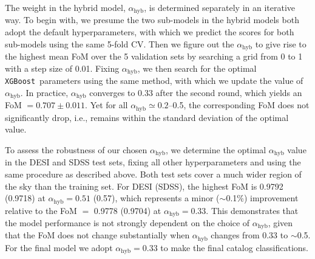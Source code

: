 \documentclass[twocolumn,tighten]{aastex631}
\newcommand{\xgboost}{\texttt{XGBoost}}
\begin{document}
\begin{CJK*}{UTF8}{gbsn}
The weight in the hybrid model, $\alpha_\mathrm{hyb}$, is determined separately in an iterative way. To begin with, we presume the two sub-models in the hybrid models both adopt the default hyperparameters, with which we predict the scores for both sub-models using the same 5-fold CV. Then we figure out the $\alpha_\mathrm{hyb}$ to give rise to the highest mean FoM over the 5 validation sets by searching a grid from 0 to 1 with a step size of 0.01. Fixing $\alpha_\mathrm{hyb}$, we then search for the optimal \xgboost\ parameters using the same method, with which we update the value of $\alpha_\mathrm{hyb}$. In practice, $\alpha_\mathrm{hyb}$ converges to 0.33 after the second round, which yields an FoM $= 0.707\pm0.011$. Yet for all $\alpha_\mathrm{hyb}\simeq0.2$--0.5, the corresponding FoM does not significantly drop, i.e., remains within the standard deviation of the optimal value. {To assess the robustness of our chosen $\alpha_\mathrm{hyb}$, we determine the optimal $\alpha_\mathrm{hyb}$ value in the DESI and SDSS test sets, fixing all other hyperparameters and using the same procedure as described above. Both test sets cover a much wider region of the sky than the training set. For DESI (SDSS), the highest FoM is 0.9792 (0.9718) at $\alpha_\mathrm{hyb}= 0.51$ (0.57), which represents a minor ($\sim$0.1\%) improvement relative to the FoM $=$ 0.9778 (0.9704) at $\alpha_\mathrm{hyb}= 0.33$. This demonstrates that the model performance is not strongly dependent on the choice of $\alpha_\mathrm{hyb}$, given that the FoM does not change substantially when $\alpha_\mathrm{hyb}$ changes from 0.33 to $\sim$0.5. For the final model we adopt $\alpha_\mathrm{hyb} = 0.33$ to make the final catalog classifications.

}





\end{CJK*}
\end{document}
